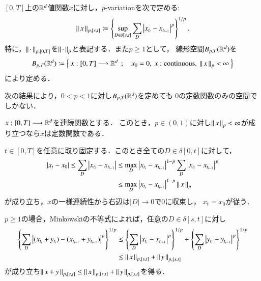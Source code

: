 \begin{screen}
	\begin{dfn}[$p$-variation]
		$[0,T]$上の$\mathbb{R}^d$値関数$x$に対し，$p$-variationを次で定める:
		\begin{align}
			\left\|\, x\, \right\|_{p,[s,t]}
			\coloneqq \left\{ \operatorname*{sup}_{D \in \delta[s,t]} \sum_{D} 
				\left| x_{t_i} - x_{t_{i-1}} \right|^p \right\}^{1/p}.
		\end{align}
		特に，$\left\|\, \cdot\, \right\|_{p,[0,T]}$を$\left\|\, \cdot\, \right\|_{p}$と表記する．また$p \geq 1$として，
		線形空間$B_{p,T}(\mathbb{R}^d)$を
		\begin{align}
			B_{p,T}(\R^d)
			\coloneqq \Set{x:[0,T] \longrightarrow \R^d}{x_0=0,\ x:\mbox{continuous},\ \Norm{x}{p} < \infty}
		\end{align}
		により定める．
	\end{dfn}
\end{screen}

次の結果により，$0 < p < 1$に対し$B_{p,T}(\mathbb{R}^d)$を定めても
$0$の定数関数のみの空間でしかない．
\begin{screen}
	\begin{thm}
		$x:[0,T] \longrightarrow \mathbb{R}^d$を連続関数とする．
		このとき，$p \in (0, 1)$に対し$\left\|\, x\, \right\|_{p} < \infty$が成り立つなら$x$は定数関数である．
	\end{thm}
\end{screen}

\begin{prf}
	$t \in [0,T]$を任意に取り固定する．このとき全ての$D \in \delta[0,t]$に対して，
	\begin{align}
		|x_t - x_0| \leq \sum_D \left| x_{t_i} - x_{t_{i-1}} \right|
		&\leq \operatorname*{max}_{D} \left| x_{t_i} - x_{t_{i-1}} \right|^{1-p} 
			\sum_D \left| x_{t_i} - x_{t_{i-1}} \right|^p \\
		&\leq \operatorname*{max}_{D} \left| x_{t_i} - x_{t_{i-1}} \right|^{1-p} \left\|\, x\, \right\|_{p}
	\end{align}
	が成り立ち，$x$の一様連続性から右辺は$|D| \longrightarrow 0$で$0$に収束し，
	$x_t = x_0$が従う．
	\QED
\end{prf}

$p \geq 1$の場合，Minkowskiの不等式によれば，任意の$D \in \delta[s,t]$に対し
\begin{align}
	\left\{ \sum_D \left| (x_{t_i} + y_{t_i}) - (x_{t_{i-1}} + y_{t_{i-1}}) \right|^p \right\}^{1/p}
	&\leq \left\{ \sum_D \left| x_{t_i} - x_{t_{i-1}} \right|^p \right\}^{1/p}
		+ \left\{ \sum_D \left| y_{t_i} - y_{t_{i-1}} \right|^p \right\}^{1/p} \\
	&\leq \left\|\, x\, \right\|_{p,[s,t]} + \left\|\, y\, \right\|_{p,[s,t]}
\end{align}
が成り立ち$\left\|\, x + y\, \right\|_{p,[s,t]} \leq \left\|\, x\, \right\|_{p,[s,t]} + \left\|\, y\, \right\|_{p,[s,t]}$を得る．

